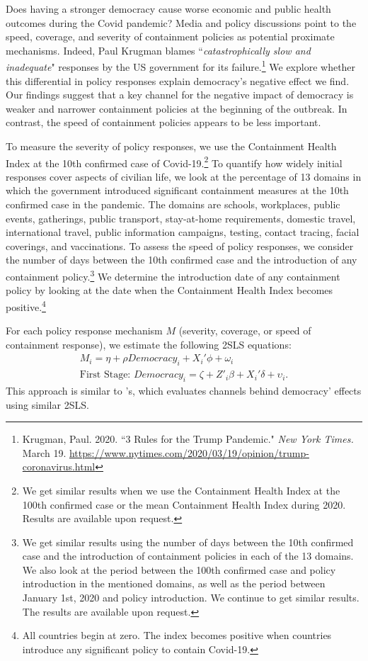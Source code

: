Does having a stronger democracy cause worse economic and public health outcomes during the Covid pandemic? Media and policy discussions point to the speed, coverage, and severity of containment policies as potential proximate mechanisms. Indeed, Paul Krugman blames ``\textit{catastrophically slow and inadequate}" responses by the US government for its failure.\footnote{Krugman, Paul. 2020. ``3 Rules for the Trump Pandemic." \emph{New York Times.} March 19. \url{https://www.nytimes.com/2020/03/19/opinion/trump-coronavirus.html}} We explore whether this differential in policy responses explain democracy's negative effect we find. Our findings suggest that a key channel for the negative impact of democracy is weaker and narrower containment policies at the beginning of the outbreak. In contrast, the speed of containment policies appears to be less important. 

To measure the severity of policy responses, we use the Containment Health Index at the 10th confirmed case of Covid-19.\footnote{We get similar results when we use the Containment Health Index at the 100th confirmed case or the mean Containment Health Index during 2020. Results are available upon request.} To quantify how widely initial responses cover aspects of civilian life, we look at the percentage of 13 domains in which the government introduced significant containment measures at the 10th confirmed case in the pandemic. The domains are schools, workplaces, public events, gatherings, public transport, stay-at-home requirements, domestic travel, international travel, public information campaigns, testing, contact tracing, facial coverings, and vaccinations. To assess the speed of policy responses, we consider the number of days between the 10th confirmed case and the introduction of any containment policy.\footnote{We get similar results using the number of days between the 10th confirmed case and the introduction of containment policies in each of the 13 domains. We also look at the period between the 100th confirmed case and policy introduction in the mentioned domains, as well as the period between January 1st, 2020 and policy introduction. We continue to get similar results. The results are available upon request.} We determine the introduction date of any containment policy by looking at the date when the Containment Health Index becomes positive.\footnote{All countries begin at zero. The index becomes positive when countries introduce any significant policy to contain Covid-19.}

For each policy response mechanism $M$ (severity, coverage, or speed of containment response), we estimate the following 2SLS  equations:
\begin{align}
M_{i} = \eta + \rho Democracy_i + X_i'\phi + \omega_i \\
\text{First Stage: }Democracy_i = \zeta + Z'_i\beta  + X_i'\delta + \upsilon_i.
\end{align}
This approach is similar to \citet{acemogluInstitutionalCauses}'s, which evaluates channels behind democracy' effects using similar 2SLS.

